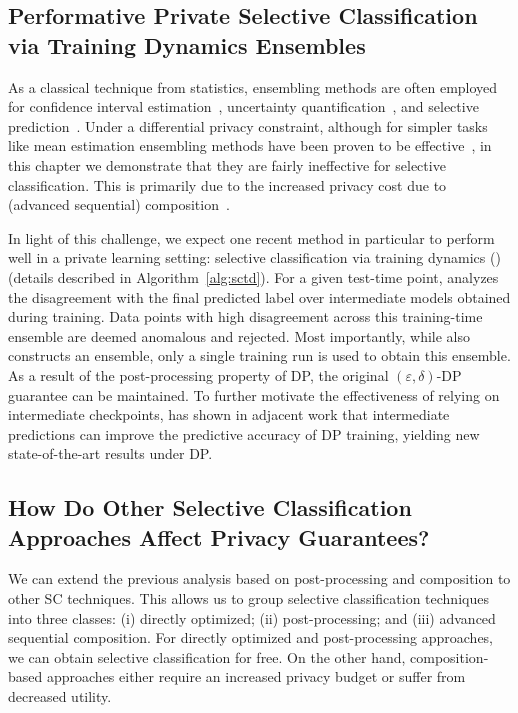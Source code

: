 \subsection{Performative Private Selective Classification via Training Dynamics Ensembles}

As a classical technique from statistics, ensembling methods are often employed for confidence interval estimation~\citep{karwa2017finite, ferrando2022parametric}, uncertainty quantification~\citep{lakshminarayanan2017simple}, and selective prediction~\citep{zaoui2020regression}. Under a differential privacy constraint, although for simpler tasks like mean estimation ensembling methods have been proven to be effective~\citep{brawner2018bootstrap,covington2021unbiased,evans2019statistically}, in this chapter we demonstrate that they are fairly ineffective for selective classification. This is primarily due to the increased privacy cost due to (advanced sequential) composition~\citep{ dwork2006calibrating}. 

In light of this challenge, we expect one recent method in particular to perform well in a private learning setting: selective classification via training dynamics (\sctd)~\citep{rabanser2022selective} (details described in Algorithm~\ref{alg:sctd}). For a given test-time point, \sctd analyzes the disagreement with the final predicted label over intermediate models obtained during training. Data points with high disagreement across this training-time ensemble are deemed anomalous and rejected. Most importantly, while \sctd also constructs an ensemble, only a single training run is used to obtain this ensemble. As a result of the post-processing property of DP, the original $(\varepsilon, \delta)$-DP guarantee can be maintained. To further motivate the effectiveness of relying on intermediate checkpoints, \citet{shejwalkar2022recycling} has shown in adjacent work that intermediate predictions can improve the predictive accuracy of DP training, yielding new state-of-the-art results under DP. 
 
\subsection{How Do Other Selective Classification Approaches Affect Privacy Guarantees?}
\label{sec:sc_affects_dp}

We can extend the previous analysis based on post-processing and composition to other SC techniques. This allows us to group selective classification techniques into three classes: (i) directly optimized; (ii) post-processing; and (iii) advanced sequential composition. For directly optimized and post-processing approaches, we can obtain selective classification for free. On the other hand, composition-based approaches either require an increased privacy budget or suffer from decreased utility.

